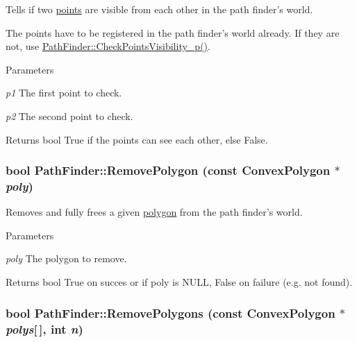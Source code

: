 Tells if two \hyperlink{structPathFinder_1_1Point}{points} are visible from each other in the path finder's world. 

The points have to be registered in the path finder's world already. If they are not, use \hyperlink{classPathFinder_a12fb7b7f54766d8bbf5753a5a036a5f0}{PathFinder::CheckPointsVisibility\_\-p()}.


\begin{DoxyParams}{Parameters}
\item[{\em p1}]The first point to check. \item[{\em p2}]The second point to check. \end{DoxyParams}
\begin{DoxyReturn}{Returns}
bool True if the points can see each other, else False. 
\end{DoxyReturn}
\hypertarget{classPathFinder_adbc8795e40ef601769a2659c241b4cb9}{
\subsubsection[{RemovePolygon}]{\setlength{\rightskip}{0pt plus 5cm}bool PathFinder::RemovePolygon (const {\bf ConvexPolygon} $\ast$ {\em poly})}}
\label{classPathFinder_adbc8795e40ef601769a2659c241b4cb9}


Removes and fully frees a given \hyperlink{structPathFinder_1_1ConvexPolygon}{polygon} from the path finder's world. 


\begin{DoxyParams}{Parameters}
\item[{\em poly}]The polygon to remove. \end{DoxyParams}
\begin{DoxyReturn}{Returns}
bool True on succes or if poly is NULL, False on failure (e.g. not found). 
\end{DoxyReturn}
\hypertarget{classPathFinder_a4707e0176f1a42c14f71fabc1cca4927}{
\subsubsection[{RemovePolygons}]{\setlength{\rightskip}{0pt plus 5cm}bool PathFinder::RemovePolygons (const {\bf ConvexPolygon} $\ast$ {\em polys}\mbox{[}$\,$\mbox{]}, \/  int {\em n})}}
\label{classPathFinder_a4707e0176f1a42c14f71fabc1cca4927}



